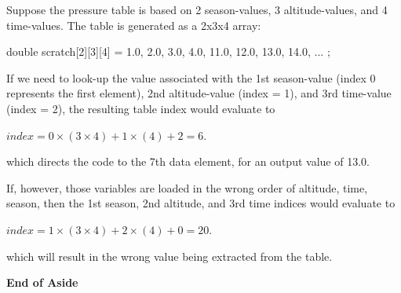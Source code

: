 \documentclass[11pt,fleqn]{report}
\begin{document}
Suppose the pressure table is based on 2 season-values, 3 altitude-values, and
 4 time-values.  The table is generated as a 2x3x4 array:
\begin{code}
double scratch[2][3][4] = {{{ 1.0,  2.0,  3.0,  4.0},
                            {11.0, 12.0, 13.0, 14.0},
                            {          ...           }}};
\end{code}
If we need to look-up the value associated with the 1st season-value
 (index 0 represents the first element),
 2nd altitude-value (index = 1), and 3rd time-value (index = 2), the resulting
 table index would evaluate to

$index = 0 \times (3 \times 4) + 1 \times (4) + 2 = 6$.

 which directs the code to the 7th data element, for an output value of 13.0.

If, however, those variables are loaded in the wrong order of altitude, time,
 season, then the 1st season, 2nd altitude, and 3rd time indices would evaluate
 to

$index = 1 \times (3 \times 4) + 2 \times (4) + 0 = 20$.

 which will result in the wrong value being extracted from the table.

\textbf{End of Aside}
\end{document}
